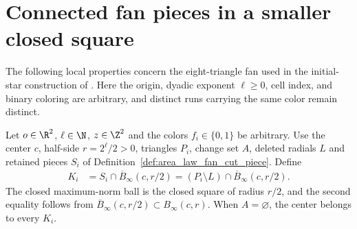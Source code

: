 \section{Connected fan pieces in a smaller closed square}
\label{sec:area_law_fan_closed_half}

The following local properties concern the eight-triangle fan used in the
initial-star construction of \cite[Section~11]{OpenAI2026AreaLaw}.
Here the origin, dyadic exponent $\ell\ge 0$, cell index, and binary
coloring are arbitrary, and distinct runs carrying the same color remain
distinct.


\begin{definition}
    \label{def:area_law_fan_closed_half_piece}
    \leanok
    Let $o\in\R^2$, $\ell\in\N$, $z\in\Z^2$ and the colors
    $f_i\in\{0,1\}$ be arbitrary. Use the center $c$, half-side
    $r=2^\ell/2>0$, triangles $P_i$, change set $A$, deleted radials
    $L$ and retained pieces $S_i$ of
    Definition~\ref{def:area_law_fan_cut_piece}. Define
    \begin{align}
        K_i
         & =S_i\cap\overline B_\infty(c,r/2)
        =(P_i\setminus L)\cap\overline B_\infty(c,r/2).
    \end{align}
    The closed maximum-norm ball is the closed square of radius $r/2$, and
    the second equality follows from
    $\overline B_\infty(c,r/2)\subset B_\infty(c,r)$.
    When $A=\varnothing$, the center belongs to every $K_i$.
\end{definition}

